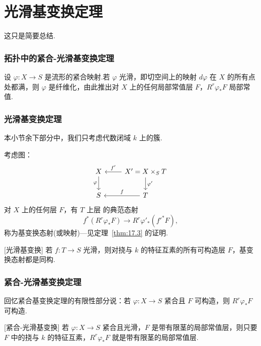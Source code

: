 ﻿%
\chapter{光滑基变换定理}\label{sec:20}

这只是简要总结.

\subsection*{拓扑中的紧合-光滑基变换定理}

设 $\varphi \colon X \to S$ 是流形的紧合映射.若 $\varphi$ 光滑，即切空间上的映射 $d\varphi$ 在 $X$ 的所有点处都满，则 $\varphi$ 是纤维化，由此推出对 $X$ 上的任何局部常值层 $F$，$R^{r}\varphi_{*}F$ 局部常值.

\subsection*{光滑基变换定理}

本小节余下部分中，我们只考虑代数闭域 $k$ 上的簇.

考虑图：
\[
\begin{tikzcd}
X \arrow[d, "\varphi"'] & X' = X \times_{S} T \arrow[l, "f'"'] \arrow[d, "\varphi'"] \\
S & T \arrow[l, "f"']
\end{tikzcd}
\]
对 $X$ 上的任何层 $F$，有 $T$ 上层 的典范态射
\[
f^{*}(R^{r}\varphi_{*}F) \to R^{r}\varphi'_*(f'^{*}F),
\]
称为基变换态射(或映射)---见定理~\ref{thm:17.3} 的证明.

\begin{theorem}\label{thm:20.1}[光滑基变换]
若 $f \colon T \to S$ 光滑，则对挠与 $k$ 的特征互素的所有可构造层 $F$，基变换态射都是同构.
\end{theorem}

\subsection*{紧合-光滑基变换定理}

回忆紧合基变换定理的有限性部分说：若 $\varphi \colon X \to S$ 紧合且 $F$ 可构造，则 $R^{r}\varphi_{*}F$ 可构造.

\begin{theorem}\label{thm:20.2}[紧合-光滑基变换]
若 $\varphi \colon X \to S$ 紧合且光滑，$F$ 是带有限茎的局部常值层，则只要 $F$ 中的挠与 $k$ 的特征互素，$R^{r}\varphi_{*}F$ 就是带有限茎的局部常值层.
\end{theorem}


